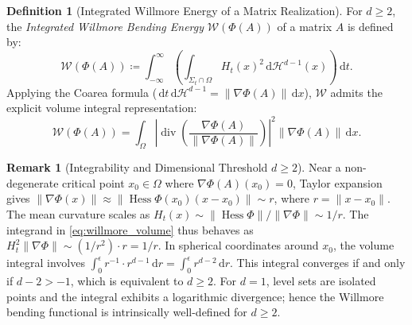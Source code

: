 \documentclass[11pt,a4paper,reqno]{amsart}
\theoremstyle{definition}
\newtheorem{definition}[theorem]{Definition}
\newtheorem{remark}[theorem]{Remark}
\numberwithin{equation}{section}
\newcommand{\dif}{\,\mathrm{d}}
\newcommand{\Hess}{\operatorname{Hess}}
\begin{document}
\begin{definition}[Integrated Willmore Energy of a Matrix Realization]
For $d \ge 2$, the \emph{Integrated Willmore Bending Energy} $\mathcal{W}(\Phi(A))$ of a matrix $A$ is defined by:
\begin{equation}
    \mathcal{W}(\Phi(A)) \coloneqq \int_{-\infty}^\infty \left( \int_{\Sigma_t \cap \Omega} H_t(x)^2 \dif \mathcal{H}^{d-1}(x) \right) \dif t.
\end{equation}
Applying the Coarea formula ($\dif t \dif \mathcal{H}^{d-1} = \|\nabla \Phi(A)\| \dif x$), $\mathcal{W}$ admits the explicit volume integral representation:
\begin{equation}
    \mathcal{W}(\Phi(A)) = \int_\Omega \left| \operatorname{div}\left(\frac{\nabla \Phi(A)}{\|\nabla \Phi(A)\|}\right) \right|^2 \|\nabla \Phi(A)\| \dif x.
    \label{eq:willmore_volume}
\end{equation}
\end{definition}

\begin{remark}[Integrability and Dimensional Threshold $d \ge 2$]
Near a non-degenerate critical point $x_0 \in \Omega$ where $\nabla \Phi(A)(x_0) = 0$, Taylor expansion gives $\|\nabla \Phi(x)\| \approx \|\Hess \Phi(x_0) (x - x_0)\| \sim r$, where $r = \|x - x_0\|$. The mean curvature scales as $H_t(x) \sim \|\Hess \Phi\| / \|\nabla \Phi\| \sim 1/r$. The integrand in \eqref{eq:willmore_volume} thus behaves as $H_t^2 \|\nabla \Phi\| \sim (1/r^2) \cdot r = 1/r$. In spherical coordinates around $x_0$, the volume integral involves $\int_0^\epsilon r^{-1} \cdot r^{d-1} \dif r = \int_0^\epsilon r^{d-2} \dif r$. This integral converges if and only if $d-2 > -1$, which is equivalent to $d \ge 2$. For $d = 1$, level sets are isolated points and the integral exhibits a logarithmic divergence; hence the Willmore bending functional is intrinsically well-defined for $d \ge 2$.
\end{remark}
\end{document}
